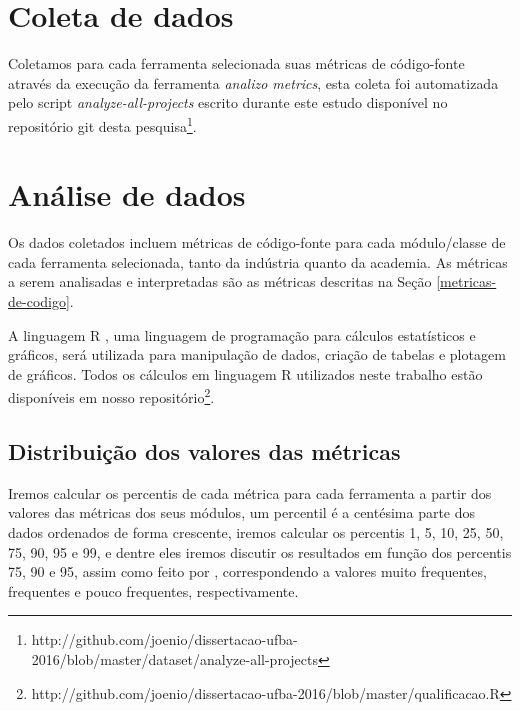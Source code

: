 

\section{Coleta de dados}

Coletamos para cada ferramenta selecionada suas métricas de código-fonte através
da execução da ferramenta {\it analizo metrics}, esta coleta foi automatizada pelo
script {\it analyze-all-projects} escrito durante este estudo disponível no repositório
git desta pesquisa\footnote{http://github.com/joenio/dissertacao-ufba-2016/blob/master/dataset/analyze-all-projects}.

\section{Análise de dados} \label{analise}

Os dados coletados incluem métricas de código-fonte para cada módulo/classe de
cada ferramenta selecionada, tanto da indústria quanto da academia. As
métricas a serem analisadas e interpretadas são as métricas descritas na Seção
\ref{metricas-de-codigo}.

A linguagem R \cite{Ihaka1996}, uma linguagem de programação para cálculos
estatísticos e gráficos, será utilizada para manipulação de dados, criação de
tabelas e plotagem de gráficos. Todos os cálculos em linguagem R utilizados
neste trabalho estão disponíveis
em nosso repositório\footnote{http://github.com/joenio/dissertacao-ufba-2016/blob/master/qualificacao.R}.

\subsection{Distribuição dos valores das métricas}

Iremos calcular os percentis de cada métrica para cada ferramenta a partir dos
valores das métricas dos seus módulos, um percentil é a centésima parte dos
dados ordenados de forma crescente, iremos calcular os percentis 1, 5, 10, 25,
50, 75, 90, 95 e 99, e dentre eles iremos discutir os resultados em função dos
percentis 75, 90 e 95, assim como feito por ,
correspondendo a valores muito frequentes, frequentes e pouco frequentes,
respectivamente.

